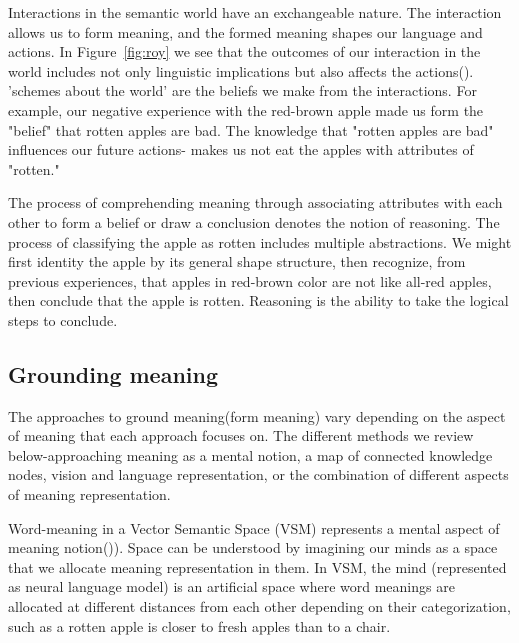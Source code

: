\documentclass[11pt, a4paper]{article}
\begin{document}

Interactions in the semantic world have an exchangeable nature. The interaction allows us to form meaning, and the formed meaning shapes our language and actions. In Figure~\ref{fig:roy} we see that the outcomes of our interaction in the world includes not only linguistic implications but also affects the actions(\cite{roy2005semiotic}). 'schemes about the world' are the beliefs we make from the interactions. For example, our negative experience with the red-brown apple made us form the  "belief" that rotten apples are bad. The knowledge that "rotten apples are bad" influences our future actions- makes us not eat the apples with attributes of "rotten." 

The process of comprehending meaning through associating attributes with each other to form a belief or draw a conclusion denotes the notion of reasoning. The process of classifying the apple as rotten includes multiple abstractions. We might first identity the apple by its general shape structure, then recognize, from previous experiences, that apples in red-brown color are not like all-red apples, then conclude that the apple is rotten. Reasoning is the ability to take the logical steps to conclude.  
 


\subsection{Grounding meaning}

The approaches to ground meaning(form meaning) vary depending on the aspect of meaning that each approach focuses on. The different methods we review below-approaching meaning as a mental notion, a map of connected knowledge nodes,  vision and language representation, or the combination of different aspects of meaning representation. 

Word-meaning in a Vector Semantic Space (VSM) represents a mental aspect of meaning notion(\cite{Turney_2010})). Space can be understood by imagining our minds as a space that we allocate meaning representation in them. In VSM, the mind (represented as neural language model) is an artificial space where word meanings are allocated at different distances from each other depending on their categorization, such as a rotten apple is closer to fresh apples than to a chair. 
\end{document}
